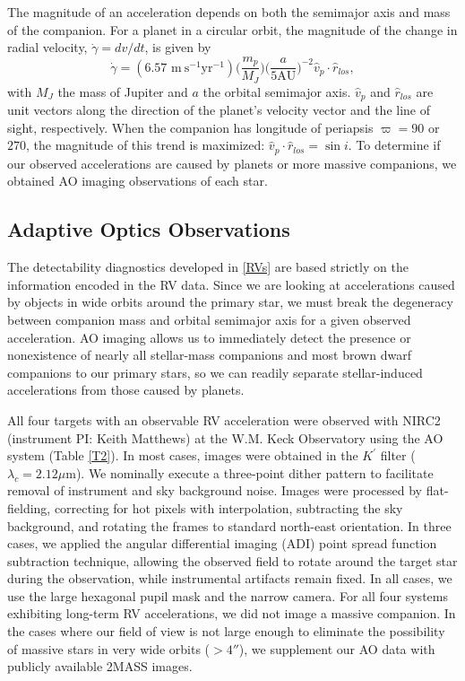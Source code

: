 The magnitude of an acceleration depends on both the semimajor axis and mass of the companion. For a planet in a circular orbit, the magnitude of the change in radial velocity, $\dot{\gamma} = dv/dt$, is given by
\begin{equation}
\dot{\gamma} = (6.57 \mbox{ m} \: \mbox{s}^{-1} \mbox{yr}^{-1})\bigg(\frac{m_p}{M_J}\bigg)\bigg(\frac{a}{5 \mbox{AU}}\bigg)^{-2} \hat{v}_p \cdot \hat{r}_{los},
\label{TrendSize}
\end{equation}
with $M_J$ the mass of Jupiter and $a$ the orbital semimajor axis. $\hat{v}_p$ and $\hat{r}_{los}$ are unit vectors along the direction of the planet's velocity vector and the line of sight, respectively. When the companion has longitude of periapsis $\varpi = 90$ or $270$, the magnitude of this trend is maximized: $\hat{v}_p \cdot \hat{r}_{los} = \sin i$. To determine if our observed accelerations are caused by planets or more massive companions, we obtained AO imaging observations of each star.




\subsection{Adaptive Optics Observations}
\label{AO Description}
The detectability diagnostics developed in \textsection\ref{RVs} are based strictly on the information encoded in the RV data. Since we are looking at accelerations caused by objects in wide orbits around the primary star, we must break the degeneracy between companion mass and orbital semimajor axis for a given observed acceleration. AO imaging allows us to immediately detect the presence or nonexistence of nearly all stellar-mass companions and most brown dwarf companions to our primary stars, so we can readily separate stellar-induced accelerations from those caused by planets. 

All four targets with an observable RV acceleration were observed with NIRC2 (instrument PI: Keith Matthews) at the W.M. Keck Observatory using the AO system \citep{Wizinowich00} (Table \ref{T2}). In most cases, images were obtained in the $K^\prime$ filter ($\lambda_c = 2.12 \mu$m). We nominally execute a three-point dither pattern to facilitate removal of instrument and sky background noise. Images were processed by flat-fielding, correcting for hot pixels with interpolation, subtracting the sky background, and rotating the frames to standard north-east orientation. In three cases, we applied the angular differential imaging (ADI) point spread function subtraction technique, allowing the observed field to rotate around the target star during the observation, while instrumental artifacts remain fixed. In all cases, we use the large hexagonal pupil mask and the narrow camera. For all four systems exhibiting long-term RV accelerations, we did not image a massive companion. In the cases where our field of view is not large enough to eliminate the possibility of massive stars in very wide orbits ($ > 4''$), we supplement our AO data with publicly available 2MASS images. 
 

